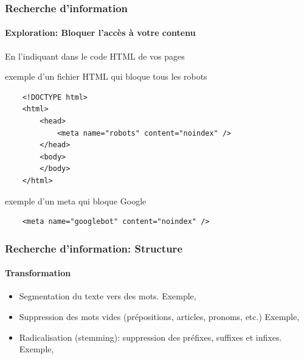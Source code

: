 \documentclass[xcolor=table]{beamer}
\begin{document}
\begin{frame}[fragile]
\frametitle{Recherche d'information}
\framesubtitle{Exploration: Bloquer l'accès à votre contenu}

En l'indiquant dans le code HTML de vos pages

\begin{exampleblock}{exemple d'un fichier HTML qui bloque tous les robots}
	\scriptsize\bfseries
	\begin{lstlisting}
	<!DOCTYPE html>
	<html>
	    <head>
	        <meta name="robots" content="noindex" />
	    </head>
	    <body>
	    </body>
	</html>
	\end{lstlisting}
\end{exampleblock}

\begin{exampleblock}{exemple d'un meta qui bloque Google}
	\scriptsize\bfseries
	\begin{lstlisting}
	<meta name="googlebot" content="noindex" />
	\end{lstlisting}
\end{exampleblock}

\end{frame}

\begin{frame}
\frametitle{Recherche d'information: Structure}
\framesubtitle{Transformation}

\begin{itemize}
	\item Segmentation du texte vers des mots. 
	Exemple, 
	
	\item Suppression des mots vides (prépositions, articles, pronoms, etc.)
	Exemple, 
	
	\item Radicalisation (stemming): suppression des préfixes, suffixes et infixes. 
	Exemple, 
\end{itemize}

\end{frame}
\end{document}
